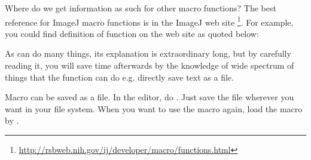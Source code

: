 Where do we get information as such for other macro functions? The best reference for ImageJ macro functions is in the ImageJ web site
\footnote{\url{http://rsbweb.nih.gov/ij/developer/macro/functions.html}}. 
For example, you could find definition of  function on the web site as quoted below:\\
\begin{indentCom}
\end{indentCom}

As  can do many things, its explanation is extraordinary long, but by carefully reading it, you will save time afterwards by the knowledge of wide spectrum of things that the  function can do e.g. directly save text as a file. 


Macro can be saved as a file.
In the editor, do . Just save the file wherever you want in your file system. When you want to use the macro again, load the macro by .

